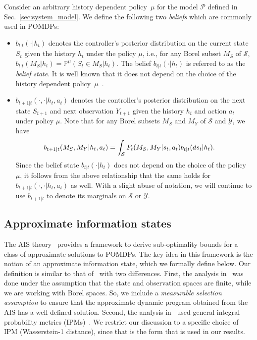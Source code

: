 \documentclass[letterpaper, 10pt]{IEEEtran}
\theoremstyle{plain}
\theoremstyle{nonumberplain}
\theoremstyle{plain}
\newcommand*\ALPHABET{\mathcal}
\newcommand*\PR{\mathds{P}}
\begin{document}
Consider an arbitrary history dependent policy~$\mu$ for the model $\ALPHABET P$ defined in Sec.~\ref{sec:system_model}.
We define the following two \emph{beliefs} which are commonly used in POMDPs:
\begin{itemize}
   \item $b_{t|t}(\cdot | h_t)$ denotes the controller's posterior distribution on the current state $S_t$ given the history $h_t$ under the policy $\mu$, i.e., for any Borel subset $M_S$ of $\ALPHABET S$, $b_{t|t}(M_S |h_t) = \PR^{\mu}(S_t \in M_S | h_t)$. 
   The belief $b_{t|t}(\cdot | h_t)$ is referred to as the \emph{belief state}. It is well known that it does not depend on the choice of the history dependent policy~$\mu$~\cite{Astrom1965,Smallwood1973}.
   \item $b_{t+1|t}(\cdot, \cdot | h_t, a_t)$ denotes the controller's posterior distribution on the next state $S_{t+1}$ and next observation $Y_{t+1}$ given the history $h_t$ and action $a_t$ under policy $\mu$. Note that for any Borel subsets $M_S$ and $M_Y$ of $\ALPHABET S$ and $\ALPHABET Y$, we have
   \[
     \hskip -1.5em
      b_{t+1|t}(M_S, M_Y | h_t, a_t) = \int_{\ALPHABET S} P_t(M_S, M_Y | s_t, a_t) b_{t|t}(ds_t | h_t).
   \]
   Since the belief state $b_{t|t}(\cdot | h_t)$ does not depend on the choice of the policy~$\mu$, it follows from the above relationship that the same holds for $b_{t+1|t}(\cdot, \cdot | h_t, a_t)$ as well. With a slight abuse of notation, we will continue to use $b_{t+1|t}$ to denote its marginals on $\ALPHABET S$ or $\ALPHABET Y$.
\end{itemize}

\subsection{Approximate information states}\label{sec:AIS}

The AIS theory~\cite{AIS} provides a framework to derive sub-optimality bounds for a class of approximate solutions to POMDPs. The key idea in this framework is the notion of an approximate information state, which we formally define below. Our definition is similar to that of~\cite{AIS} with two differences. First, the analysis in~\cite{AIS} was done under the assumption that the state and observation spaces are finite, while we are working with Borel spaces. So, we include a \emph{measurable selection assumption} to ensure that the approximate dynamic program obtained from the AIS has a well-defined solution.  Second, the analysis in~\cite{AIS} used general integral probability metrics (IPMs)~\cite{muller1997}. We restrict our discussion to a specific choice of IPM (Wasserstein-1 distance), since that is the form that is used in our results. 
\end{document}
